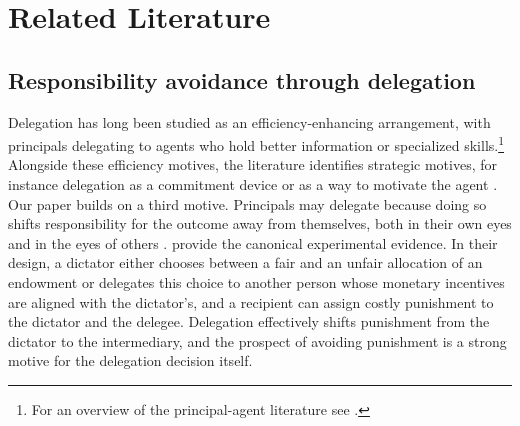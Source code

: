 %

\section{Related Literature} \label{literature}

\subsection*{Responsibility avoidance through delegation}

Delegation has long been studied as an efficiency-enhancing arrangement, with principals delegating to agents who hold better information or specialized skills.\footnote{For an overview of the principal-agent literature see \citet{bolton_contract_2005}.} Alongside these efficiency motives, the literature identifies strategic motives, for instance delegation as a commitment device \citep{schelling_strategy_1960, fershtman_gneezy_2001} or as a way to motivate the agent \citep{aghion_formal_1997}. Our paper builds on a third motive. Principals may delegate because doing so shifts responsibility for the outcome away from themselves, both in their own eyes and in the eyes of others \citep{weaver_politics_1986, fiorina_legislator_1986}. \citet{bartling_shifting_2012} provide the canonical experimental evidence. In their design, a dictator either chooses between a fair and an unfair allocation of an endowment or delegates this choice to another person whose monetary incentives are aligned with the dictator's, and a recipient can assign costly punishment to the dictator and the delegee. Delegation effectively shifts punishment from the dictator to the intermediary, and the prospect of avoiding punishment is a strong motive for the delegation decision itself.

